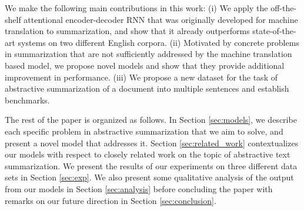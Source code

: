 We make the following main contributions in this work: (i) We apply the off-the-shelf attentional encoder-decoder RNN that was originally developed for machine translation to summarization, and show that it already outperforms state-of-the-art systems on two different English corpora. (ii) Motivated by concrete problems in summarization that are not sufficiently addressed by the machine translation based model, we propose novel models and show that they provide additional improvement in performance. (iii) We propose a new dataset for the task of abstractive summarization of a document into multiple sentences and establish benchmarks.  

The rest of the paper is organized as follows. In Section \ref{sec:models}, we describe each specific problem in abstractive summarization that we aim to solve, and present a novel model that addresses it. Section \ref{sec:related_work} contextualizes our models with respect to closely related work on the topic of abstractive text summarization. We present the results of our experiments on three different data sets in Section \ref{sec:exp}. We also present some qualitative analysis of the output from our models in Section \ref{sec:analysis} before concluding the paper with remarks on our future direction in Section \ref{sec:conclusion}.


